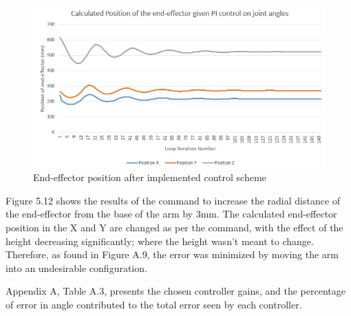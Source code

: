 \documentclass[12pt,openany,a4paper]{book}
\begin{document}
\begin{center}
\begin{figure}[htb]
  \includegraphics[width=\linewidth]{control_loop_position.jpg}
\caption{ End-effector position after implemented control scheme }
\end{figure}
\end{center}

Figure 5.12 shows the results of the command to increase the radial distance of the end-effector from the base of the arm by 3mm. The calculated end-effector position in the X and Y are changed as per the command, with the effect of the height decreasing significantly; where the height wasn't meant to change. Therefore, as found in Figure A.9, the error was minimized by moving the arm into an undesirable configuration.





Appendix A, Table A.3, presents the chosen controller gains, and the percentage of error in angle contributed to the total error seen by each controller.
\end{document}
